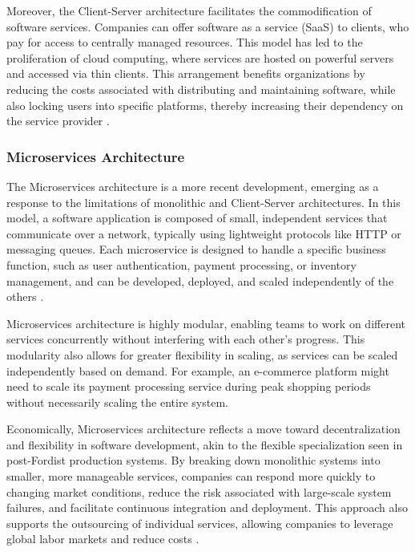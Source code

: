 \begin{refsection}
Moreover, the Client-Server architecture facilitates the commodification of software services. Companies can offer software as a service (SaaS) to clients, who pay for access to centrally managed resources. This model has led to the proliferation of cloud computing, where services are hosted on powerful servers and accessed via thin clients. This arrangement benefits organizations by reducing the costs associated with distributing and maintaining software, while also locking users into specific platforms, thereby increasing their dependency on the service provider \cite[pp.~121-123]{Buschmann2007}.

\subsubsection{Microservices Architecture}

The Microservices architecture is a more recent development, emerging as a response to the limitations of monolithic and Client-Server architectures. In this model, a software application is composed of small, independent services that communicate over a network, typically using lightweight protocols like HTTP or messaging queues. Each microservice is designed to handle a specific business function, such as user authentication, payment processing, or inventory management, and can be developed, deployed, and scaled independently of the others \cite[pp.~77-80]{Bass2021}.

Microservices architecture is highly modular, enabling teams to work on different services concurrently without interfering with each other's progress. This modularity also allows for greater flexibility in scaling, as services can be scaled independently based on demand. For example, an e-commerce platform might need to scale its payment processing service during peak shopping periods without necessarily scaling the entire system.

Economically, Microservices architecture reflects a move toward decentralization and flexibility in software development, akin to the flexible specialization seen in post-Fordist production systems. By breaking down monolithic systems into smaller, more manageable services, companies can respond more quickly to changing market conditions, reduce the risk associated with large-scale system failures, and facilitate continuous integration and deployment. This approach also supports the outsourcing of individual services, allowing companies to leverage global labor markets and reduce costs \cite[pp.~98-102]{Buschmann2007}.


\end{refsection}
